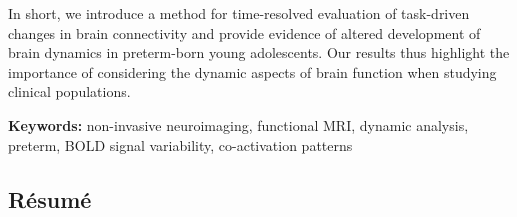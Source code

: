 \hspace{1cm} In short, we introduce a method for time-resolved evaluation of task-driven changes in brain connectivity and provide evidence of altered development of brain dynamics in preterm-born young adolescents. Our results thus highlight the importance of considering the dynamic aspects of brain function when studying clinical populations.

\vspace{1cm}

\hspace{1cm} \textbf{Keywords:} non-invasive neuroimaging, functional MRI, dynamic analysis, preterm, BOLD signal variability, co-activation patterns



\begin{otherlanguage}{french}
\cleardoublepage
\chapter*{Résumé}
\end{otherlanguage}


